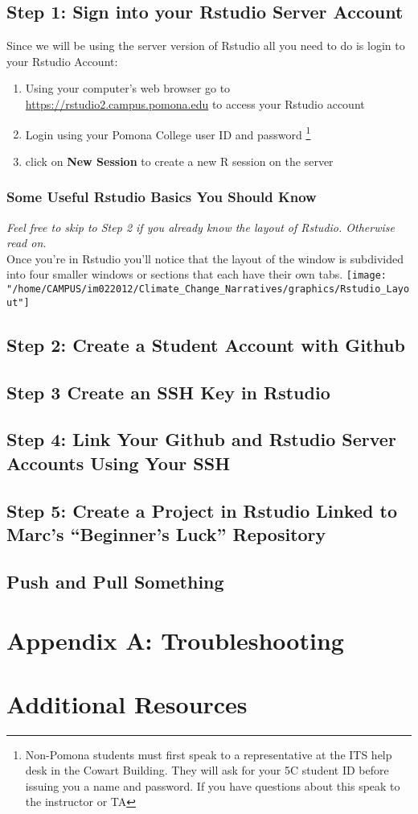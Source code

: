 \documentclass{article}\usepackage[]{graphicx}\usepackage[]{color}
\begin{document}
  \subsection*{Step 1: Sign into your Rstudio Server Account}
Since we will be using the server version of Rstudio all you need to do is login to your Rstudio Account:
    \begin{enumerate}
    \item Using your computer's web browser go to \url{https://rstudio2.campus.pomona.edu} to access your Rstudio account
    \item Login using your Pomona College user ID and password \footnote{Non-Pomona students must first speak to a representative at the ITS help desk in the Cowart Building. They will ask for your 5C student ID before issuing you a name and password. If you have questions about this speak to the instructor or TA}
    \item click on \textbf{New Session} to create a new R session on the server
    \end{enumerate}
  \subsubsection*{Some Useful Rstudio Basics You Should Know}
  \emph{Feel free to skip to Step 2 if you already know the layout of Rstudio. Otherwise read on.}\\
  Once you're in Rstudio you'll notice that the layout of the window is subdivided into four smaller windows or sections that each have their own tabs. 
\texttt{[image: "/home/CAMPUS/im022012/Climate\_Change\_Narratives/graphics/Rstudio\_Layout"]}
  
  
  \subsection*{Step 2: Create a Student Account with Github}
  \subsection*{Step 3 Create an SSH Key in Rstudio}
  \subsection*{Step 4: Link Your Github and Rstudio Server Accounts Using Your SSH}
  \subsection*{Step 5: Create a Project in Rstudio Linked to Marc's ``Beginner's Luck'' Repository}
  \subsection*{Push and Pull Something}
  
\section{Appendix A: Troubleshooting}
\section{Additional Resources}
\end{document}
